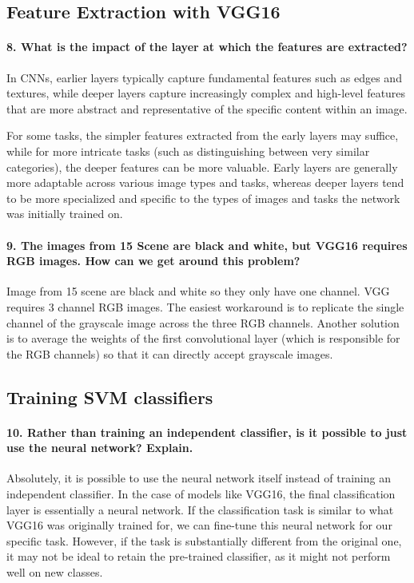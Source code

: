 \subsection{Feature Extraction with VGG16}
\paragraph{8. What is the impact of the layer at which the features are extracted?}
In CNNs, earlier layers typically capture fundamental features such as edges and textures, while deeper layers capture increasingly complex and high-level features that are more abstract and representative of the specific content within an image.

For some tasks, the simpler features extracted from the early layers may suffice, while for more intricate tasks (such as distinguishing between very similar categories), the deeper features can be more valuable. Early layers are generally more adaptable across various image types and tasks, whereas deeper layers tend to be more specialized and specific to the types of images and tasks the network was initially trained on.

\paragraph{9. The images from 15 Scene are black and white, but VGG16 requires RGB images. How can we get around this problem?}
Image from 15 scene are black and white so they only have one channel. VGG requires 3 channel RGB images. The easiest workaround is to replicate the single channel of the grayscale image across the three RGB channels. Another solution is to average the weights of the first convolutional layer (which is responsible for the RGB channels) so that it can directly accept grayscale images.

\subsection{Training SVM classifiers}
\paragraph{10. Rather than training an independent classifier, is it possible to just use the neural network? Explain.}
Absolutely, it is possible to use the neural network itself instead of training an independent classifier. In the case of models like VGG16, the final classification layer is essentially a neural network. If the classification task is similar to what VGG16 was originally trained for, we can fine-tune this neural network for our specific task. However, if the task is substantially different from the original one, it may not be ideal to retain the pre-trained classifier, as it might not perform well on new classes.

